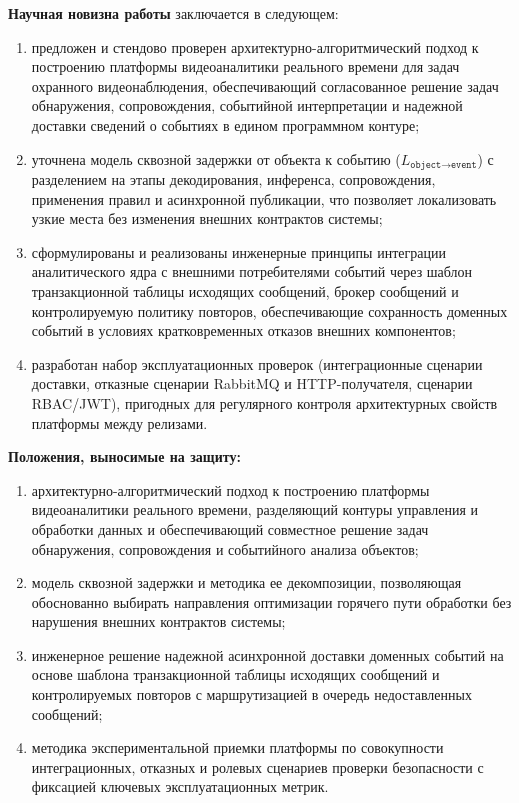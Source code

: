 \textbf{Научная новизна работы} заключается в следующем:
\begin{enumerate}
    \item предложен и стендово проверен архитектурно-алгоритмический подход к построению платформы видеоаналитики реального времени для задач охранного видеонаблюдения, обеспечивающий согласованное решение задач обнаружения, сопровождения, событийной интерпретации и надежной доставки сведений о событиях в едином программном контуре;
    \item уточнена модель сквозной задержки от объекта к событию (\(L_{\texttt{object} \rightarrow \texttt{event}}\)) с разделением на этапы декодирования, инференса, сопровождения, применения правил и асинхронной публикации, что позволяет локализовать узкие места без изменения внешних контрактов системы;
    \item сформулированы и реализованы инженерные принципы интеграции аналитического ядра с внешними потребителями событий через шаблон транзакционной таблицы исходящих сообщений, брокер сообщений и контролируемую политику повторов, обеспечивающие сохранность доменных событий в условиях кратковременных отказов внешних компонентов;
    \item разработан набор эксплуатационных проверок (интеграционные сценарии доставки, отказные сценарии RabbitMQ и HTTP-получателя, сценарии RBAC/JWT), пригодных для регулярного контроля архитектурных свойств платформы между релизами.
\end{enumerate}

\textbf{Положения, выносимые на защиту:}
\begin{enumerate}
    \item архитектурно-алгоритмический подход к построению платформы видеоаналитики реального времени, разделяющий контуры управления и обработки данных и обеспечивающий совместное решение задач обнаружения, сопровождения и событийного анализа объектов;
    \item модель сквозной задержки и методика ее декомпозиции, позволяющая обоснованно выбирать направления оптимизации горячего пути обработки без нарушения внешних контрактов системы;
    \item инженерное решение надежной асинхронной доставки доменных событий на основе шаблона транзакционной таблицы исходящих сообщений и контролируемых повторов с маршрутизацией в очередь недоставленных сообщений;
    \item методика экспериментальной приемки платформы по совокупности интеграционных, отказных и ролевых сценариев проверки безопасности с фиксацией ключевых эксплуатационных метрик.
\end{enumerate}

